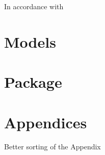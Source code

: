 \documentclass[12pt,a4paper]{article}
\begin{document}
In accordance with

\hypertarget{models}{%
\section{Models}\label{models}}

\hypertarget{package}{%
\section{Package}\label{package}}

\pagebreak


\printbibliography[title = References]
\cleardoublepage

\begin{refsection}
\nocite{R-base}
\nocite{R-stargazer}
\nocite{R-stringr}
\nocite{R-tidyr}
\nocite{R-dplyr}
\nocite{R-glmnet}
\nocite{R-class}
\nocite{R-MASS}
\nocite{R-plm}
\nocite{R-leaps}
\nocite{R-caret}
\nocite{R-tree}
\nocite{R-gbm}
\nocite{R-plotmo}
\nocite{R-pls}
\nocite{R-splines}
\nocite{R-tictoc}
\nocite{R-plotly}
\nocite{R-inspectdf}
\nocite{R-rpart}
\nocite{R-rpart.plot}
\nocite{R-stargazer}
\nocite{R-knitr}
\nocite{R-purrr}
\nocite{R-randomForest}
\nocite{R-rstudioapi}





\nocite{R-Studio}

\printbibliography[title = Software-References]
\end{refsection}

\cleardoublepage
\appendix
\setcounter{table}{0}
\setcounter{figure}{0}
\renewcommand{\thetable}{A\arabic{table}}
\renewcommand{\thefigure}{A\arabic{figure}}


\hypertarget{appendices}{%
\section{Appendices}\label{appendices}}

Better sorting of the Appendix

\restoregeometry

\cleardoublepage
\newpage
\renewcommand*{\mkbibnamefamily}[1]{\textbf{#1}}
\renewcommand*{\mkbibnamegiven}[1]{\textbf{#1}}
\renewcommand*{\mkbibnameprefix}[1]{\textbf{#1}}
\renewcommand*{\mkbibnamesuffix}[1]{\textbf{#1}}
\end{document}
